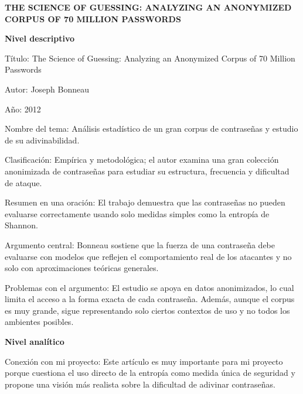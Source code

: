 \documentclass[12pt, letterpaper]{article}
\begin{document}
\begin{center}
    \vspace{0.8cm}
    {\Large \bfseries THE SCIENCE OF GUESSING: ANALYZING AN ANONYMIZED CORPUS OF 70 MILLION PASSWORDS} \\
    \vspace{0.4cm}
\end{center}

\vspace{1.5cm}

\noindent
\textbf{Nivel descriptivo} \newline

\noindent
Título: The Science of Guessing: Analyzing an Anonymized Corpus of 70 Million Passwords \newline

\noindent
Autor: Joseph Bonneau \newline

\noindent
Año: 2012 \newline

\noindent
Nombre del tema: Análisis estadístico de un gran corpus de contraseñas y estudio de su adivinabilidad. \newline

\noindent
Clasificación: Empírica y metodológica; el autor examina una gran colección anonimizada de contraseñas para estudiar su estructura, frecuencia y dificultad de ataque.\newline

\noindent
Resumen en una oración: El trabajo demuestra que las contraseñas no pueden evaluarse correctamente usando solo medidas simples como la entropía de Shannon. \newline

\noindent
Argumento central: Bonneau sostiene que la fuerza de una contraseña debe evaluarse con modelos que reflejen el comportamiento real de los atacantes y no solo con aproximaciones teóricas generales.\newline

\noindent
Problemas con el argumento: El estudio se apoya en datos anonimizados, lo cual limita el acceso a la forma exacta de cada contraseña. Además, aunque el corpus es muy grande, sigue representando solo ciertos contextos de uso y no todos los ambientes posibles.
\newpage 

\noindent
\textbf{Nivel analítico} \newline

\noindent
Conexión con mi proyecto: Este artículo es muy importante para mi proyecto porque cuestiona el uso directo de la entropía como medida única de seguridad y propone una visión más realista sobre la dificultad de adivinar contraseñas.\newline
\end{document}
